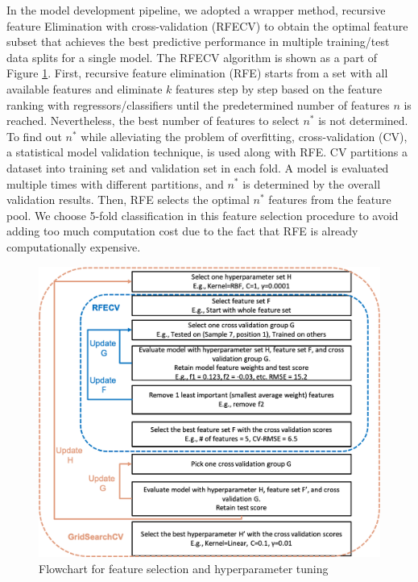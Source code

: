 In the model development pipeline, we adopted a wrapper method, recursive feature Elimination with cross-validation (RFECV) to obtain the optimal feature subset that achieves the best predictive performance in multiple training/test data splits for a single model. The RFECV algorithm is shown as a part of Figure \ref{fig: rfecv logocv}. First, recursive feature elimination (RFE) starts from a set with all available features and eliminate $k$ features step by step based on the feature ranking with regressors/classifiers until the predetermined number of features $n$ is reached. Nevertheless, the best number of features to select $n^*$ is not determined. To find out $n^*$ while alleviating the problem of overfitting, cross-validation (CV), a statistical model validation technique, is used along with RFE. CV partitions a dataset into training set and validation set in each fold. A model is evaluated multiple times with different partitions, and $n^*$ is determined by the overall validation results. Then, RFE selects the optimal $n^*$ features from the feature pool. We choose 5-fold classification in this feature selection procedure to avoid adding too much computation cost due to the fact that RFE is already computationally expensive.

\begin{figure}[tb]
    \centering
    \includegraphics[width=0.8\linewidth]{fig/rfecv.png}
    \caption{Flowchart for feature selection and hyperparameter tuning}
    \label{fig: rfecv logocv}
\end{figure}

